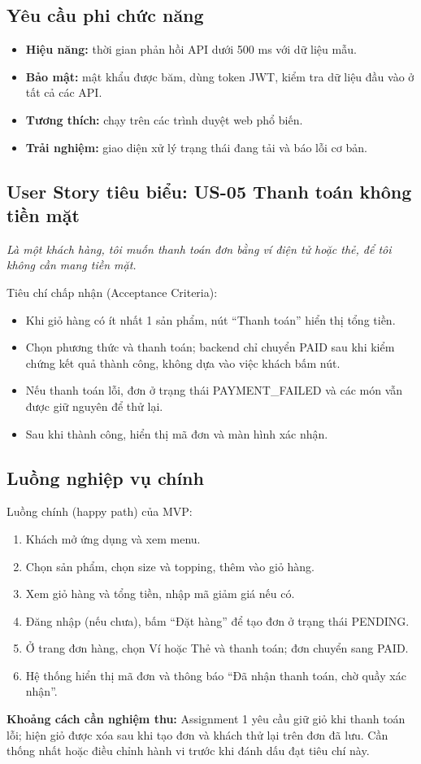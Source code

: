 \documentclass[a4paper]{article}
\begin{document}
\subsection{Yêu cầu phi chức năng}
\begin{itemize}
	\item \textbf{Hiệu năng:} thời gian phản hồi API dưới 500 ms với dữ liệu mẫu.
	\item \textbf{Bảo mật:} mật khẩu được băm, dùng token JWT, kiểm tra dữ liệu đầu vào ở tất cả các API.
	\item \textbf{Tương thích:} chạy trên các trình duyệt web phổ biến.
	\item \textbf{Trải nghiệm:} giao diện xử lý trạng thái đang tải và báo lỗi cơ bản.
\end{itemize}

\subsection{User Story tiêu biểu: US-05 Thanh toán không tiền mặt}
\textit{Là một khách hàng, tôi muốn thanh toán đơn bằng ví điện tử hoặc thẻ, để tôi không cần mang tiền mặt.}

Tiêu chí chấp nhận (Acceptance Criteria):
\begin{itemize}
	\item Khi giỏ hàng có ít nhất 1 sản phẩm, nút ``Thanh toán'' hiển thị tổng tiền.
	\item Chọn phương thức và thanh toán; backend chỉ chuyển PAID sau khi kiểm chứng kết quả thành công, không dựa vào việc khách bấm nút.
	\item Nếu thanh toán lỗi, đơn ở trạng thái PAYMENT\_FAILED và các món vẫn được giữ nguyên để thử lại.
	\item Sau khi thành công, hiển thị mã đơn và màn hình xác nhận.
\end{itemize}

\subsection{Luồng nghiệp vụ chính}
Luồng chính (happy path) của MVP:
\begin{enumerate}
	\item Khách mở ứng dụng và xem menu.
	\item Chọn sản phẩm, chọn size và topping, thêm vào giỏ hàng.
	\item Xem giỏ hàng và tổng tiền, nhập mã giảm giá nếu có.
	\item Đăng nhập (nếu chưa), bấm ``Đặt hàng'' để tạo đơn ở trạng thái PENDING.
	\item Ở trang đơn hàng, chọn Ví hoặc Thẻ và thanh toán; đơn chuyển sang PAID.
	\item Hệ thống hiển thị mã đơn và thông báo ``Đã nhận thanh toán, chờ quầy xác nhận''.
\end{enumerate}
\textbf{Khoảng cách cần nghiệm thu:} Assignment 1 yêu cầu giữ giỏ khi thanh toán lỗi; hiện giỏ được xóa sau khi tạo đơn và khách thử lại trên đơn đã lưu. Cần thống nhất hoặc điều chỉnh hành vi trước khi đánh dấu đạt tiêu chí này.
\end{document}
